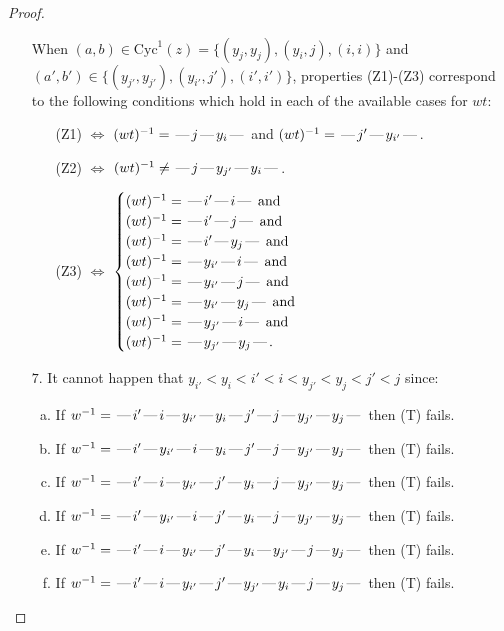 \documentclass[10pt]{article}
\theoremstyle{definition}
\theoremstyle{definition}
\def\dash{\text{\hspace{0.5mm}---\hspace{0.5mm}}}
\def\Cyc{\mathrm{Cyc}}
\begin{document}
\begin{proof}
\begin{enumerate}
\begin{enumerate}
\end{enumerate}
When $(a,b)\in\Cyc^1(z)=\{(y_j,y_j),(y_i,j),(i,i)\}$ and $(a',b')\in\{(y_{j'},y_{j'}),(y_{i'},j'),(i',i')\}$,
properties (Z1)-(Z3) correspond to the following conditions which
hold in each of the available cases for $wt$:
\begin{enumerate}
\item[](Z1) $\Leftrightarrow$ $(wt)^{-1} = \dash j \dash y_i \dash$  and $(wt)^{-1} = \dash j' \dash y_{i'} \dash$.
\item[](Z2) $\Leftrightarrow$ $(wt)^{-1} \neq \dash j \dash y_{j'} \dash y_i \dash$.
\item[](Z3) $\Leftrightarrow$ $\begin{cases}\text{$(wt)^{-1} = \dash i' \dash i \dash$}\text{ and }\\
\text{$(wt)^{-1} = \dash i' \dash j \dash$}\text{ and }\\
\text{$(wt)^{-1} = \dash i' \dash y_j \dash$}\text{ and }\\
\text{$(wt)^{-1} = \dash y_{i'} \dash i \dash$}\text{ and }\\
\text{$(wt)^{-1} = \dash y_{i'} \dash j \dash$}\text{ and }\\
\text{$(wt)^{-1} = \dash y_{i'} \dash y_j \dash$}\text{ and }\\
\text{$(wt)^{-1} = \dash y_{j'} \dash i \dash$}\text{ and }\\
\text{$(wt)^{-1} = \dash y_{j'} \dash y_j \dash$}.\end{cases}$
\end{enumerate}
\item[$7$.] It cannot happen that $y_{i'} < y_i < i' < i < y_{j'} < y_j < j' < j$ since:
\begin{enumerate}[(a)]
\item If $w^{-1} = \dash i'\dash i\dash y_{i'}\dash y_i\dash j'\dash j\dash y_{j'}\dash y_j\dash $ then (T) fails.
\item If $w^{-1} = \dash i'\dash y_{i'}\dash i\dash y_i\dash j'\dash j\dash y_{j'}\dash y_j\dash $ then (T) fails.
\item If $w^{-1} = \dash i'\dash i\dash y_{i'}\dash j'\dash y_i\dash j\dash y_{j'}\dash y_j\dash $ then (T) fails.
\item If $w^{-1} = \dash i'\dash y_{i'}\dash i\dash j'\dash y_i\dash j\dash y_{j'}\dash y_j\dash $ then (T) fails.
\item If $w^{-1} = \dash i'\dash i\dash y_{i'}\dash j'\dash y_i\dash y_{j'}\dash j\dash y_j\dash $ then (T) fails.
\item If $w^{-1} = \dash i'\dash i\dash y_{i'}\dash j'\dash y_{j'}\dash y_i\dash j\dash y_j\dash $ then (T) fails.

\end{enumerate}
\end{enumerate}
\end{proof}
\end{document}
